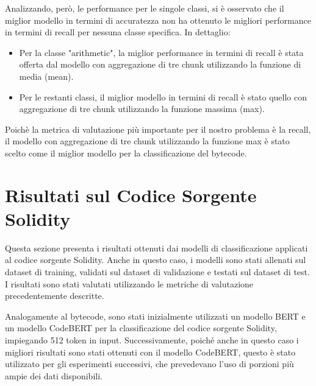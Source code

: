\documentclass[../../Thesis.tex]{subfiles}
\begin{document}
Analizzando, però, le performance per le singole classi, si è osservato che il miglior modello in termini di accuratezza non ha ottenuto le migliori performance in termini di recall per nessuna classe specifica. In dettaglio:
\begin{itemize}
    \item Per la classe "arithmetic", la miglior performance in termini di recall è stata offerta dal modello con aggregazione di tre chunk utilizzando la funzione di media (mean).
    \item Per le restanti classi, il miglior modello in termini di recall è stato quello con aggregazione di tre chunk utilizzando la funzione massima (max).
\end{itemize}
Poichè la metrica di valutazione più importante per il nostro problema è la recall, il modello con aggregazione di tre chunk utilizzando la funzione max è stato scelto come il miglior modello per la classificazione del bytecode.


\section{Risultati sul Codice Sorgente Solidity}

Questa sezione presenta i risultati ottenuti dai modelli di classificazione applicati al codice sorgente Solidity. Anche in questo caso, i modelli sono stati allenati sul dataset di training, validati sul dataset di validazione e testati sul dataset di test. I risultati sono stati valutati utilizzando le metriche di valutazione precedentemente descritte.

Analogamente al bytecode, sono stati inizialmente utilizzati un modello BERT e un modello CodeBERT per la classificazione del codice sorgente Solidity, impiegando 512 token in input. Successivamente, poiché anche in questo caso i migliori risultati sono stati ottenuti con il modello CodeBERT, questo è stato utilizzato per gli esperimenti successivi, che prevedevano l'uso di porzioni più ampie dei dati disponibili.
\end{document}
